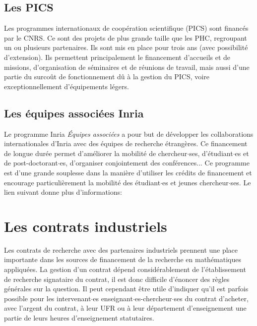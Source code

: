 \subsection{Les PICS} \label{PICS}
Les programmes internationaux de coop\'eration scientifique (PICS)
sont financ\'es par le CNRS.
Ce sont des projets de plus grande taille que les PHC, regroupant un
ou plusieurs partenaires. Ils sont mis en place pour trois ans (avec
possibilit\'e d'extension). Ils permettent principalement le
financement d'accueils et de missions, d'organisation de
s\'eminaires et de r\'eunions de travail, mais aussi d'une partie du
surco\^ut de fonctionnement d\^u \`a la gestion du PICS, voire
exceptionnellement d'\'equipements l\'egers. \\

\subsection{Les \'equipes associ\'ees Inria}
Le programme Inria \textit{\'Equipes associ\'ees} a pour but de d\'evelopper les collaborations internationales
d'Inria avec des \'equipes de recherche \'etrang\`eres.
Ce financement de  longue dur\'ee permet d'am\'eliorer la mobilit\'e de chercheur$\cdot$ses,
d'\'etudiant$\cdot$es et de post-doctorant$\cdot$es, d'organiser conjointement  des conf\'erences...
Ce programme est d'une grande souplesse dans la mani\`ere d'utiliser les cr\'edits de financement et
 encourage particuli\`erement la mobilit\'e des \'etudiant$\cdot$es et jeunes chercheur$\cdot$ses. Le lien suivant donne plus d'informations: \\ 

\section{Les contrats industriels}
Les contrats de recherche avec des partenaires industriels prennent
une place importante dans les sources de financement de la recherche en
math\'ematiques appliqu\'ees. La gestion d'un contrat d\'epend
consid\'erablement de l'\'etablissement de recherche signataire du
contrat, il est donc difficile d'\'enoncer des r\`egles
g\'en\'erales sur la question. Il peut cependant \^etre utile d'indiquer
qu'il est parfois possible pour les intervenant$\cdot$es
enseignant$\cdot$es-chercheur$\cdot$ses du contrat d'acheter, avec l'argent du
contrat, \`a leur UFR ou \`a leur d\'epartement d'enseignement une
partie de leurs heures d'enseignement statutaires.
